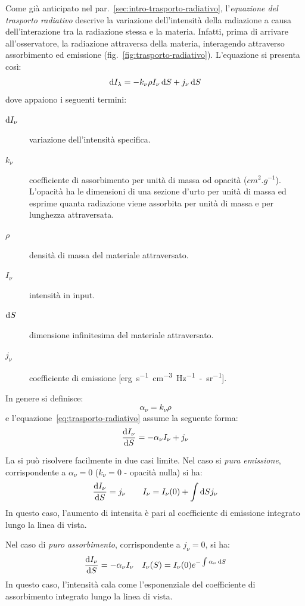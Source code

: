 Come già anticipato nel par.~\ref{sec:intro-trasporto-radiativo}, l'\emph{equazione del trasporto radiativo} descrive la variazione dell'intensità della radiazione a causa dell'interazione tra la radiazione stessa e la materia. Infatti, prima di arrivare all'osservatore, la radiazione attraversa della materia, interagendo attraverso assorbimento ed emissione (fig.~\ref{fig:trasporto-radiativo}). L'equazione si presenta così:
\begin{equation}\label{eq:trasporto-radiativo}
    \mathop{\mathrm{{}d}}\mathopen{} I_\lambda = - k_\nu \rho I_\nu \mathop{\mathrm{{}d}}\mathopen{} S + j_\nu \mathop{\mathrm{{}d}}\mathopen{} S
\end{equation}
dove appaiono i seguenti termini:
\begin{description}
    \item[$\mathop{\mathrm{{}d}}\mathopen{} I_\nu$] variazione dell'intensità specifica.
    \item[$k_\nu$] coefficiente di assorbimento per unità di massa od opacità ($\si{cm^2.g^{-1}}$). L'opacità ha le dimensioni di una sezione d'urto per unità di massa ed esprime quanta radiazione viene assorbita per unità di massa e per lunghezza attraversata.
    \item[$\rho$] densità di massa del materiale attraversato.
    \item[$I_\nu$] intensità in input.
    \item[$\mathop{\mathrm{{}d}}\mathopen{} S$] dimensione infinitesima del materiale attraversato.
    \item[$j_\nu$] coefficiente di emissione [\si{erg.s^{-1}.cm^{-3}.Hz^{-1}-sr^{-1}}].
\end{description}

In genere si definisce:
\begin{equation}
\alpha_\nu = k_\nu \rho
\end{equation}
e l'equazione~\eqref{eq:trasporto-radiativo} assume la seguente forma:
\begin{equation}\label{eq:trasporto-radiativo2}
    \frac{\mathop{\mathrm{{}d}}\mathopen{} I_\nu}{\mathop{\mathrm{{}d}}\mathopen{} S} = -\alpha_\nu I_\nu + j_\nu
\end{equation}

La si può risolvere facilmente in due casi limite. Nel caso si \emph{pura emissione}, corrispondente a $\alpha_\nu = 0$ ($k_\nu = 0$ - opacità nulla) si ha:
\[
    \frac{\mathop{\mathrm{{}d}}\mathopen{} I_\nu}{\mathop{\mathrm{{}d}}\mathopen{} S} = j_\nu \qquad I_\nu = I_\nu (0) + \int \mathop{\mathrm{{}d}}\mathopen{} S j_\nu
\]
In questo caso, l'aumento di intensita è pari al coefficiente di emissione integrato lungo la linea di vista.

Nel caso di \emph{puro assorbimento}, corrispondente a $j_\nu = 0$, si ha:
\[
\frac{\mathop{\mathrm{{}d}}\mathopen{} I_\nu}{\mathop{\mathrm{{}d}}\mathopen{} S} = -\alpha_\nu I_\nu \quad 
I_\nu (S) = I_\nu (0) e^{-\int \alpha_\nu \mathop{\mathrm{{}d}}\mathopen{} S}
\]
In questo caso, l'intensità cala come l'esponenziale del coefficiente di assorbimento integrato lungo la linea di vista.

